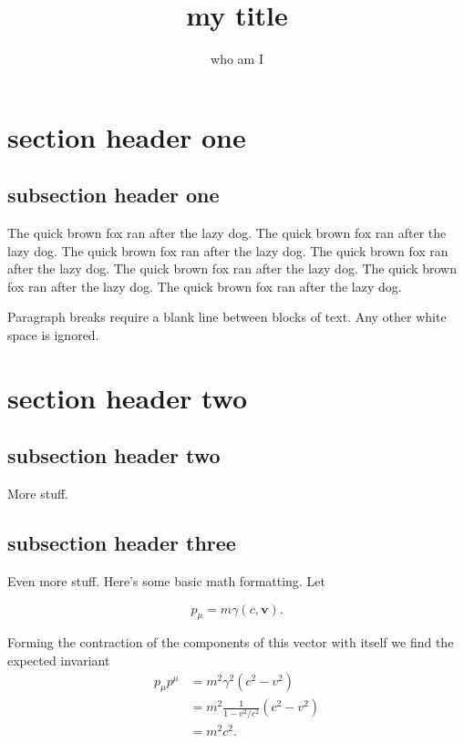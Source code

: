 \documentclass{article}
\author{who am I}
\begin{document}
\title{my title}

\maketitle 

\section{section header one}
\subsection{subsection header one}

The quick brown fox ran after the lazy dog.
The quick brown fox ran after the lazy dog.
The quick brown fox ran after the lazy dog.
The quick brown fox ran after the lazy dog.
The quick brown fox ran after the lazy dog.
The quick brown fox ran after the lazy dog.
The quick brown fox ran after the lazy dog.

Paragraph breaks require a blank line between blocks of text.  Any other white space is ignored.

\section{section header two}
\subsection{subsection header two}

More stuff.

\subsection{subsection header three}

Even more stuff.  Here's some basic math formatting.  Let

\begin{equation}\label{eqn:mysample:10}
p_\mu = m \gamma (c, \mathbf{v}).
\end{equation}

Forming the contraction of the components of this vector with itself we find the expected invariant
\begin{align*}
p_\mu p^\mu 
&= m^2 \gamma^2 (c^2 - v^2) \\
&= m^2 \frac{1}{1 - v^2/c^2} (c^2 - v^2) \\
&= m^2 c^2.
\end{align*}
\end{document}
